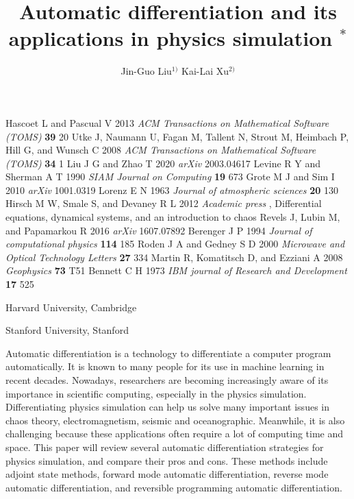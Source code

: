 \documentclass[A4,twoside,UTF8]{ctexart}
\begin{document}
\begin{thebibliography}{999}
 Hascoet L and Pascual V 2013 {\it ACM Transactions on Mathematical Software (TOMS)} {\bf 39}
20
 Utke J, Naumann U, Fagan M, Tallent N, Strout M, Heimbach P, Hill G, and Wunsch C 2008 {\it ACM Transactions on Mathematical Software (TOMS)} {\bf 34} 1
 Liu J G and Zhao T 2020 {\it arXiv} 2003.04617
 Levine R Y and Sherman A T 1990 {\it SIAM Journal on Computing} {\bf 19} 673
 Grote M J and Sim I 2010 {\it arXiv} 1001.0319
 Lorenz E N 1963 {\it Journal of atmospheric sciences} {\bf 20} 130
 Hirsch M W, Smale S, and Devaney R L 2012 {\it Academic press} , Differential equations,
dynamical systems, and an introduction to chaos
 Revels J, Lubin M, and Papamarkou R 2016 {\it arXiv} 1607.07892
 Berenger J P 1994 {\it Journal of computational physics} {\bf 114} 185
 Roden J A and Gedney S D 2000 {\it  Microwave and Optical Technology Letters} {\bf 27} 334
 Martin R, Komatitsch D, and Ezziani A 2008 {\it Geophysics} {\bf 73} T51
 Bennett C H 1973 {\it IBM journal of Research and Development} {\bf 17} 525
\end{thebibliography}

\newpage

\title{Automatic differentiation and its applications in physics simulation $^{\ast}$}%


\author{Jin-Guo Liu$^{1)}$ \quad Kai-Lai Xu$^{2)}$}

\address{1)}{Harvard University, Cambridge }
\address{2)}{Stanford University, Stanford }




\eabstract{}

\small Automatic differentiation is a technology to differentiate a computer program automatically. It is known to many people for its use in machine learning in recent decades. Nowadays, researchers are becoming increasingly aware of its importance in scientific computing, especially in the physics simulation. Differentiating physics simulation can help us solve many important issues in chaos theory, electromagnetism, seismic and oceanographic. Meanwhile, it is also challenging because these applications often require a lot of computing time and space. This paper will review several automatic differentiation strategies for physics simulation, and compare their pros and cons. These methods include adjoint state methods, forward mode automatic differentiation, reverse mode automatic differentiation, and reversible programming automatic differentiation.



\end{document}
